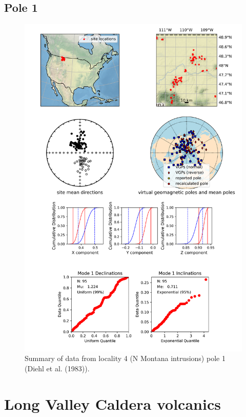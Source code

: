 \subsection{Pole 1}


\begin{figure}[H]
\centering
\includegraphics[width=5 in]{./4/1/pole_summary.png}
\caption{Summary of data from locality 4 (N Montana intrusions) pole 1 (Diehl et al. (1983)).}
\end{figure}

\section{Long Valley Caldera volcanics}
